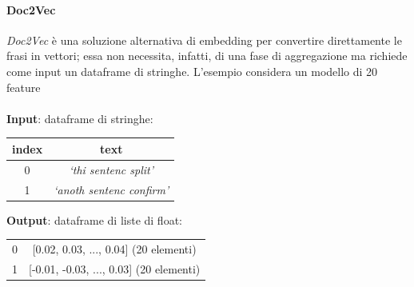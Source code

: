 \documentclass[12pt]{report}
\theoremstyle{definition}
\begin{document}
\paragraph{Doc2Vec}
\textit{Doc2Vec} è una soluzione alternativa di embedding per convertire direttamente le frasi in vettori; essa non necessita, infatti, di una fase di aggregazione ma richiede come input un dataframe di stringhe.
L'esempio considera un modello di 20 feature 
\\
\\
\textbf{Input}: dataframe di stringhe:
\begin{center}
    \begin{tabular}{|c|c|}
    \hline
    \textbf{index} & \textbf{text} \\
    \hline
         0 & \textit{`thi sentenc split'}\\
         1 & \textit{`anoth sentenc confirm'}\\
    \hline
    \end{tabular}
\end{center}
\textbf{Output}: dataframe di liste di float:
\begin{center}
    \begin{tabular}{|c|c|}
    \hline
         0 & [0.02, 0.03, ..., 0.04] (20 elementi) \\
         1 & [-0.01, -0.03, ..., 0.03] (20 elementi) \\
    \hline
    \end{tabular}
\end{center}
\end{document}
